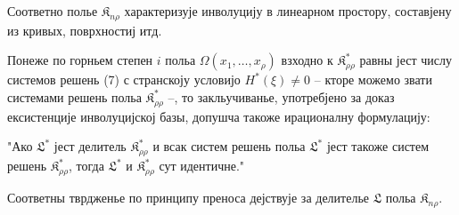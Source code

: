 ﻿\documentclass[11pt]{article}
\providecommand{\Kfield}{\mathfrak{K}}
\begin{document}
Соответно полье $\Kfield_{n\rho}$ характеризује инволуцију в линеарном простору, составјену из кривых, поврхностиј итд.

Понеже по горньем степен $i$ польа $\Omega(x_1,\ldots,x_\rho)$ взходно к $\Kfield^*_{\rho\rho}$ равны јест числу системов решень (7) с странскоју условијо $H^*(\xi)\ne0$ -- кторе можемо звати системами решень польа $\Kfield^*_{\rho\rho}$ --, то закльучиванье, употребјено за доказ ексистенције инволуцијској базы, допушча такоже ирационалну формулацију:

"Ако $\mathfrak{L}^*$ јест делитель $\Kfield^*_{\rho\rho}$ и всак систем решень польа $\mathfrak{L}^*$ јест такоже систем решень $\Kfield^*_{\rho\rho}$, тогда $\mathfrak{L}^*$ и $\Kfield^*_{\rho\rho}$ сут идентичне."

Соответны тврдженье по принципу преноса дејствује за делителье $\mathfrak{L}$ польа $\Kfield_{n\rho}$.
\end{document}
